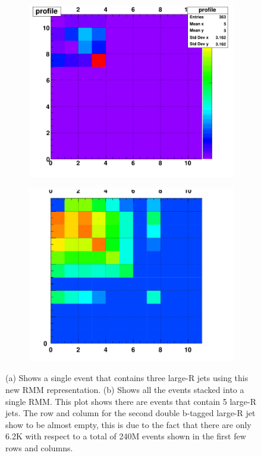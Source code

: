 \begin{figure}[ht]
    \centering
    \begin{subfigure}[h]{0.45\linewidth}
    \includegraphics[scale=0.29]{figs/ch7/rmm_event.png}%
    \caption{}
    \end{subfigure}
    \hfill
    \begin{subfigure}[h]{0.45\linewidth}
    \includegraphics[scale=0.4]{figs/ch7/validate_data_0.png}%
    \caption{}
    \end{subfigure}
    \hfill
    \caption{(a) Shows a single event that contains three large-R jets using this new RMM representation. (b) Shows all the events stacked into a single RMM. This plot shows 
    there are events that contain 5 large-R jets. The row and column for the second double b-tagged large-R jet show to be almost empty, this is due to the fact that there are only 
    6.2K with respect to a total of 240M events shown in the first few rows and columns.}
\label{fig:sh4b-rmm-valid}
\end{figure}

